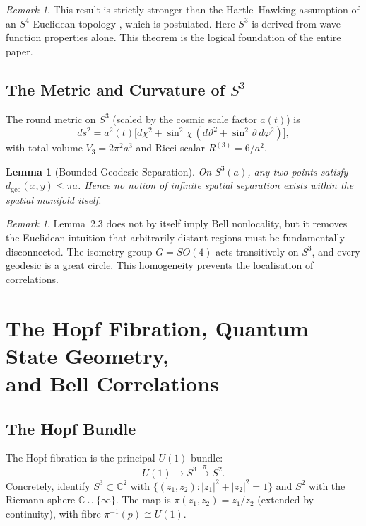 \documentclass[12pt,a4paper]{article}
\newtheorem{lemma}[theorem]{Lemma}
\theoremstyle{definition}
\theoremstyle{remark}
\newtheorem{remark}[theorem]{Remark}
\begin{document}
\begin{remark}
This result is strictly stronger than the Hartle--Hawking assumption of an $S^4$
Euclidean topology \cite{HartleHawking1983}, which is postulated. Here $S^3$ is
derived from wave-function properties alone. This theorem is the logical foundation
of the entire paper.
\end{remark}

\subsection{The Metric and Curvature of $S^3$}

The round metric on $S^3$ (scaled by the cosmic scale factor $a(t)$) is
\[
ds^2 = a^2(t)\bigl[d\chi^2 + \sin^2\!\chi\,(d\vartheta^2 + \sin^2\!\vartheta\,d\varphi^2)\bigr],
\]
with total volume $V_3 = 2\pi^2 a^3$ and Ricci scalar $R^{(3)} = 6/a^2$.

\begin{lemma}[Bounded Geodesic Separation]
On $S^3(a)$, any two points satisfy $d_{\mathrm{geo}}(x,y) \leq \pi a$.
Hence no notion of infinite spatial separation exists within the spatial manifold
itself.
\end{lemma}

\begin{remark}
Lemma~2.3 does not by itself imply Bell nonlocality, but it removes the Euclidean
intuition that arbitrarily distant regions must be fundamentally disconnected. The
isometry group $G = SO(4)$ acts transitively on $S^3$, and every geodesic is a
great circle. This homogeneity prevents the localisation of correlations.
\end{remark}

\section{The Hopf Fibration, Quantum State Geometry,\\ and Bell Correlations}
\label{sec:hopf}

\subsection{The Hopf Bundle}

The Hopf fibration is the principal $U(1)$-bundle:
\[
U(1) \longrightarrow S^3 \xrightarrow{\;\pi\;} S^2.
\]
Concretely, identify $S^3 \subset \mathbb{C}^2$ with $\{(z_1,z_2): |z_1|^2+|z_2|^2=1\}$
and $S^2$ with the Riemann sphere $\mathbb{C}\cup\{\infty\}$. The map is
$\pi(z_1,z_2) = z_1/z_2$ (extended by continuity), with fibre
$\pi^{-1}(p) \cong U(1)$.
\end{document}
